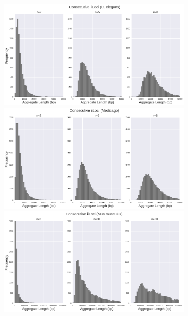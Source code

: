 \begin{figure}[!bht]
\centering
\includegraphics[width=0.85\textwidth]{Assets/Graphics/iLoci/adj-iil-cele.png}
\includegraphics[width=0.85\textwidth]{Assets/Graphics/iLoci/adj-iil-mtru.png}
\includegraphics[width=0.85\textwidth]{Assets/Graphics/iLoci/adj-iil-mmus.png}
\caption{~}
\label{Fig:AdjiiLoci}
\end{figure}


